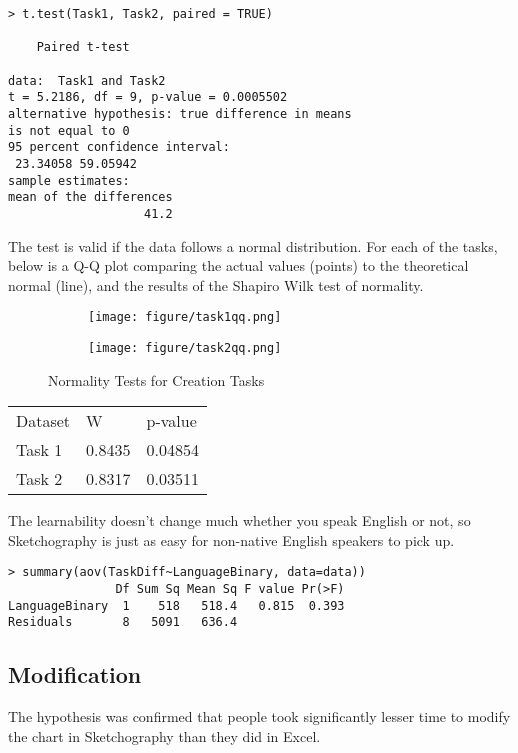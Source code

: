 \begin{verbatim}
> t.test(Task1, Task2, paired = TRUE)

	Paired t-test

data:  Task1 and Task2
t = 5.2186, df = 9, p-value = 0.0005502
alternative hypothesis: true difference in means 
is not equal to 0
95 percent confidence interval:
 23.34058 59.05942
sample estimates:
mean of the differences 
                   41.2 
\end{verbatim}

The test is valid if the data follows a normal distribution. For each of the tasks, below is a Q-Q plot comparing the actual values (points) to the theoretical normal (line), and the results of the Shapiro Wilk test of normality.

\begin{figure}[H]
		\centering
		\begin{subfigure}[b]{\textwidth}
			\texttt{[image: figure/task1qq.png]}
		\end{subfigure}
		\begin{subfigure}[b]{\textwidth}
			\texttt{[image: figure/task2qq.png]}
		\end{subfigure}
		\caption{Normality Tests for Creation Tasks}
	\end{figure}

\begin{tabular}{l l l}
Dataset & W & p-value \\
Task 1 & 0.8435 & 0.04854 \\
Task 2 & 0.8317 & 0.03511 \\
\end{tabular}

The learnability doesn't change much whether you speak English or not, so Sketchography is just as easy for non-native English speakers to pick up.
\begin{verbatim}
> summary(aov(TaskDiff~LanguageBinary, data=data))
               Df Sum Sq Mean Sq F value Pr(>F)
LanguageBinary  1    518   518.4   0.815  0.393
Residuals       8   5091   636.4                       
\end{verbatim}

\subsection{Modification}
The hypothesis was confirmed that people took significantly lesser time to modify the chart in Sketchography than they did in Excel.

